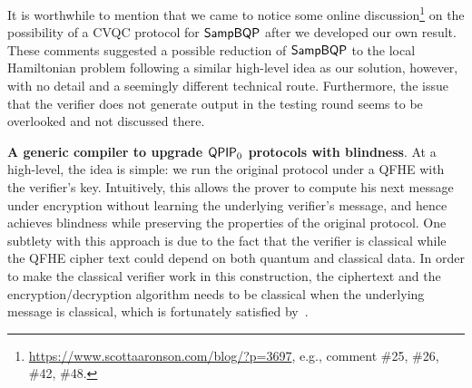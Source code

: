 

It is worthwhile to mention that we came to notice some online discussion\footnote{\url{https://www.scottaaronson.com/blog/?p=3697}, e.g., comment \#25, \#26, \#42, \#48. } on the possibility of a CVQC protocol for $\operatorname{\mathsf{SampBQP}}$ after we developed our own result. 
These comments suggested a possible reduction of $\operatorname{\mathsf{SampBQP}}$ to the local Hamiltonian problem following a similar high-level idea as our solution, however, with no detail and a seemingly different technical route. Furthermore, the issue that the verifier does not generate output in the testing round seems to be overlooked and not discussed there.

\vspace{2mm} \noindent \textbf{A generic compiler to upgrade $\operatorname{\mathsf{QPIP}}_0$ protocols with blindness}. At a high-level, the idea is simple: we run the original protocol under a QFHE with the verifier's key. Intuitively, this allows the prover to compute his next message under encryption without learning the underlying verifier's message, and hence achieves blindness while preserving the properties of the original protocol.
One subtlety with this approach is due to the fact that the verifier is classical while the QFHE cipher text could depend on both quantum and classical data.
In order to make the classical verifier work in this construction, the ciphertext and the encryption/decryption algorithm needs to be classical when the underlying message is classical, which is fortunately satisfied by~\cite{mahadev_qfhe}.

